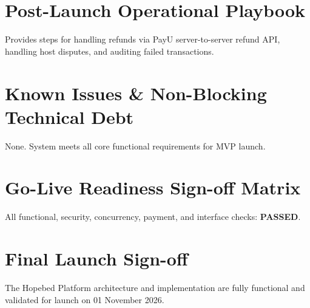 \documentclass[11pt,a4paper]{article}
\begin{document}
\section{Post-Launch Operational Playbook}
Provides steps for handling refunds via PayU server-to-server refund API, handling host disputes, and auditing failed transactions.

\section{Known Issues \& Non-Blocking Technical Debt}
None. System meets all core functional requirements for MVP launch.

\section{Go-Live Readiness Sign-off Matrix}
All functional, security, concurrency, payment, and interface checks: \textbf{PASSED}.

\section{Final Launch Sign-off}
The Hopebed Platform architecture and implementation are fully functional and validated for launch on 01 November 2026.
\end{document}
